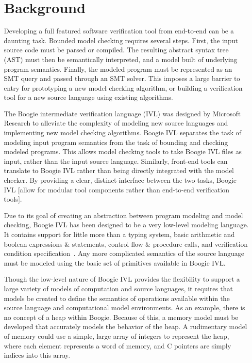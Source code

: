 \chapter{Background}
Developing a full featured software verification tool from end-to-end can be a daunting task.  Bounded model checking requires several steps.  First, the input source code must be parsed or compiled.  The resulting abstract syntax tree (AST) must then be semantically interpreted, and a model built of underlying program semantics.  Finally, the modeled program must be represented as an SMT query and passed through an SMT solver.  This imposes a large barrier to entry for prototyping a new model checking algorithm, or building a verification tool for a new source language using existing algorithms.

The Boogie intermediate verification language (IVL) was designed by Microsoft Research to alleviate the complexity of modeling new source languages and implementing new model checking algorithms.  Boogie IVL separates the task of modeling input program semantics from the task of bounding and checking modeled programs.  This allows model checking tools to take Boogie IVL files as input, rather than the input source language.  Similarly, front-end tools can translate to Boogie IVL rather than being directly integrated with the model checker.  By providing a clear, distinct interface between the two tasks, Boogie IVL [allow for modular tool components rather than end-to-end verification tools].

Due to its goal of creating an abstraction between program modeling and model checking, Boogie IVL has been designed to be a very low-level modeling language.  It contains support for little more than a typing system, basic arithmetic and boolean expressions \& statements, control flow \& procedure calls, and verification condition specification~\cite{boogie}.  Any more complicated semantics of the source language must be modeled using the basic set of primitives available in Boogie IVL.

Though the low-level nature of Boogie IVL provides the flexibility to support a large variety of models of computation and source languages, it requires that models be created to define the semantics of operations available within the source language and computational model environments.  As an example, there is no concept of a heap within Boogie.  Because of this, a memory model must be developed that accurately models the behavior of the heap.  A rudimentary model of memory could use a simple, large array of integers to represent the heap, where each element represents a word of memory, and C pointers are simply indices into this array.

